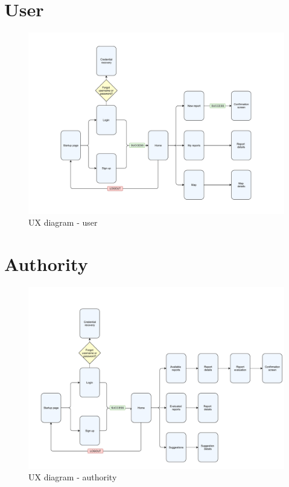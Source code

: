 \documentclass[12pt,a4paper]{report}
\begin{document}
	\section{User}
		\begin{figure}[H]
				\includegraphics[scale = 0.65, center]{userux}
				\caption{UX diagram - user}
		\end{figure}
	\section{Authority}
		\begin{figure}[H]
				\includegraphics[scale = 0.6, center]{authorityux}
				\caption{UX diagram - authority}
		\end{figure}
\end{document}
